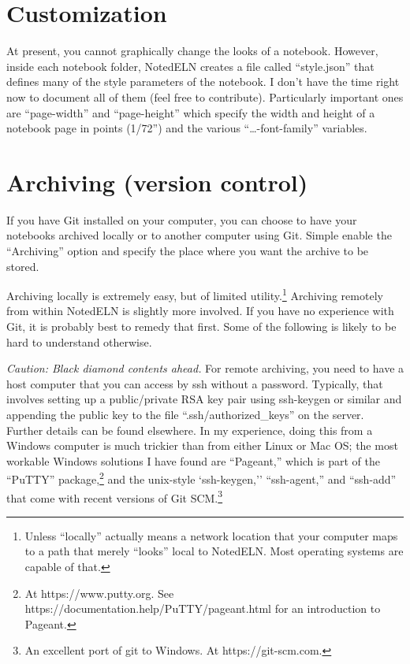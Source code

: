 \documentclass[11pt]{report}
\begin{document}
\section{Customization}

At present, you cannot graphically change the looks of a
notebook. However, inside each notebook folder, NotedELN creates a file
called ``style.json'' that defines many of the style parameters of the
notebook. I don't have the time right now to document all of them
(feel free to contribute). Particularly important ones are
``page-width'' and ``page-height'' which specify the width and height
of a notebook page in points (1/72'') and the various
``\ldots-font-family'' variables.

\section{Archiving (version control)}

If you have Git installed on your computer, you can choose to have
your notebooks archived locally or to another computer using
Git. Simple enable the ``Archiving'' option and specify the place
where you want the archive to be stored.

Archiving locally is extremely easy, but of limited
utility.\footnote{Unless ``locally'' actually means a network location
  that your computer maps to a path that merely ``looks'' local to
  NotedELN.  Most operating systems are capable of that.} Archiving
remotely from within NotedELN is slightly more involved. If you have no
experience with Git, it is probably best to remedy that first. Some of
the following is likely to be hard to understand otherwise.

\emph{Caution: Black diamond contents ahead.} For remote archiving,
you need to have a host computer that you can access by ssh without a
password. Typically, that involves setting up a public/private RSA key
pair using ssh-keygen or similar and appending the public key to the
file ``.ssh/authorized\_keys'' on the server. Further details can be
found elsewhere. In my experience, doing this from a Windows computer
is much trickier than from either Linux or Mac OS; the most workable
Windows solutions I have found are ``Pageant,'' which is part of the
``PuTTY'' package,\footnote{At https://www.putty.org. See
  https://documentation.help/PuTTY/pageant.html for an introduction to
  Pageant.} and the unix-style `ssh-keygen,'' ``ssh-agent,'' and
``ssh-add'' that come with recent versions of Git SCM.\footnote{An
  excellent port of git to Windows. At https://git-scm.com.}
\end{document}
